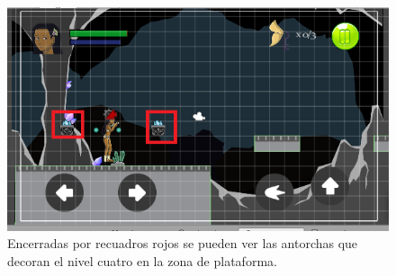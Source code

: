 \begin{figure}[h]
        \centering
        \includegraphics[height=0.2 \textheight]{03TrabajoRealizado/imagenes/objetosFondo.png}
        \caption{Encerradas por recuadros rojos se pueden ver las antorchas que decoran el nivel cuatro en la zona de plataforma.}
        \label{fig:ObjetoFon}
\end{figure}


